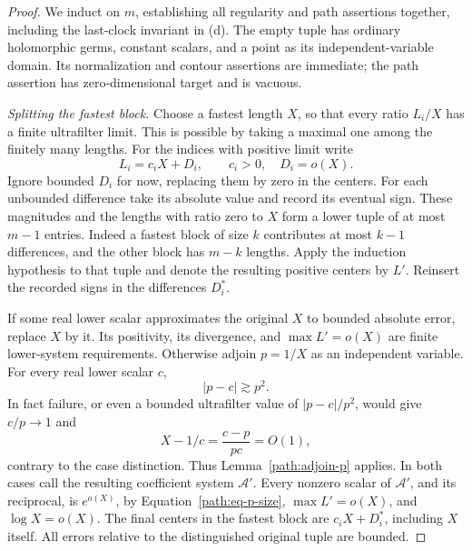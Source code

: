 \begin{proof}
We induct on \(m\), establishing all regularity and path assertions
together, including the last-clock invariant in \textup{(d)}.
The empty tuple has ordinary holomorphic germs, constant
scalars, and a point as its independent-variable domain.  Its
normalization and contour assertions are immediate; the path assertion
has zero-dimensional target and is vacuous.

\emph{Splitting the fastest block.}
Choose a fastest length \(X\), so that every ratio \(L_i/X\) has
a finite ultrafilter limit.  This is possible by taking a maximal
one among the finitely many lengths.  For the indices with positive
limit write
\[
 L_i=c_iX+D_i,\qquad c_i>0,\quad D_i=o(X).
\]
Ignore bounded \(D_i\) for now, replacing them by zero in the centers.
For each unbounded difference take its absolute value and record its
eventual sign.  These magnitudes and the lengths with ratio zero to
\(X\) form a lower tuple of at most \(m-1\) entries.  Indeed a
fastest block of size \(k\) contributes at most \(k-1\) differences,
and the other block has \(m-k\) lengths.  Apply the induction
hypothesis to that tuple and denote the resulting positive centers by
\(L'\).  Reinsert the recorded signs in the differences \(D_i^*\).

If some real lower scalar approximates the original \(X\) to bounded
absolute error, replace \(X\) by it.  Its positivity, its divergence,
and \(\max L'=o(X)\) are finite lower-system requirements.  Otherwise
adjoin \(p=1/X\) as an independent variable.  For every real lower
scalar \(c\),
\begin{equation}\label{path:eq-separation}
 |p-c|\gtrsim p^2.
\end{equation}
In fact failure, or even a bounded ultrafilter value of
\(|p-c|/p^2\), would give \(c/p\to1\) and
\[
 X-1/c=\frac{c-p}{pc}=O(1),
\]
contrary to the case distinction.  Thus Lemma~\ref{path:adjoin-p}
applies.  In both cases call the resulting coefficient system
\(\mathcal A'\).  Every nonzero scalar of \(\mathcal A'\), and its
reciprocal, is \(e^{o(X)}\), by
Equation~\eqref{path:eq-p-size}, \(\max L'=o(X)\), and
\(\log X=o(X)\).  The final centers in the fastest block are
\(c_iX+D_i^*\), including \(X\) itself.  All errors relative to the
distinguished original tuple are bounded.


\end{proof}
